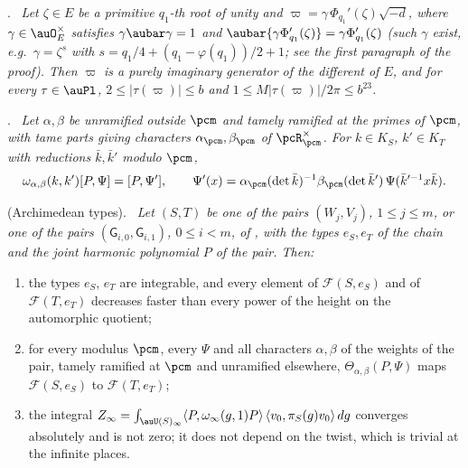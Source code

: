 \documentclass[10pt]{amsart}
\theoremstyle{definition}
\theoremstyle{remark}
\providecommand{\pcF}{\mathcal F}
\providecommand{\pcG}{\mathsf G}
\newenvironment{quotedthm}[2]{\par\medskip\noindent\begingroup
  \textbf{#1}#2.\ \itshape\ignorespaces}{\endgroup\par\medskip}
\begin{document}
\begin{quotedthm}{\cite[Lemma~5.10]{P51}}{}
Let $\zeta\in E$ be a primitive $q_1$-th root of unity and $\varpi=\gamma\,\Phi_{q_1}'(\zeta)\sqrt{-d}$,
where $\gamma\in\auO_E^\times$ satisfies $\gamma\aubar\gamma=1$ and $\aubar{\gamma\Phi'_{q_1}(\zeta)}=
\gamma\Phi'_{q_1}(\zeta)$ \textup{(}such $\gamma$ exist, e.g.\ $\gamma=\zeta^s$ with
$s=q_1/4+(q_1-\varphi(q_1))/2+1$; see the first paragraph of the proof\textup{)}. Then $\varpi$ is a purely imaginary generator of the different of $E$, and
for every $\tau\in\auPl$, $2\le|\tau(\varpi)|\le b$ and $1\le M|\tau(\varpi)|/2\pi\le b^{23}$.
\end{quotedthm}

\begin{quotedthm}{\cite[Lemma~2.9]{P53}}{}
Let $\alpha,\beta$ be unramified outside $\pcm$ and tamely ramified at the primes of $\pcm$, with
tame parts giving characters $\alpha_\pcm,\beta_\pcm$ of $\pcR_\pcm^\times$. For $k\in K_S$,
$k'\in K_T$ with reductions $\bar k,\bar k'$ modulo $\pcm$,
\[
\omega_{\alpha,\beta}(k,k')[P,\Psi]=[P,\Psi'],\qquad\Psi'(x)=\alpha_\pcm(\det\bar k)^{-1}\beta_\pcm
(\det\bar k')\,\Psi(\bar k'^{-1}x\bar k).
\]
\end{quotedthm}

\begin{quotedthm}{\cite[Lemma~2.10]{P53}}{ (Archimedean types)}
Let $(S,T)$ be one of the pairs $(W_j,V_j)$, $1\le j\le m$, or one of the pairs
$(\pcG_{i,0},\pcG_{i,1})$, $0\le i<m$, of {\cite[\S2.5]{P53}}, with the types $e_S,e_T$ of the
chain and the joint harmonic polynomial $P$ of the pair. Then:
\begin{enumerate}
\item[(A1)] the types $e_S$, $e_T$ are integrable, and every element of $\pcF(S,e_S)$ and of
$\pcF(T,e_T)$ decreases faster than every power of the height on the automorphic quotient;
\item[(A2)] for every modulus $\pcm$, every $\Psi$ and all characters $\alpha,\beta$ of the weights
of the pair, tamely ramified at $\pcm$ and unramified elsewhere, $\Theta_{\alpha,\beta}(P,\Psi)$
maps $\pcF(S,e_S)$ to $\pcF(T,e_T)$;
\item[(A3)] the integral $Z_\infty=\int_{\auU(S)_\infty}\langle P,\omega_\infty(g,1)P\rangle\,\langle
v_0,\pi_S(g)v_0\rangle\,dg$ converges absolutely and is not zero; it does not depend on the twist,
which is trivial at the infinite places.
\end{enumerate}
\end{quotedthm}
\end{document}
